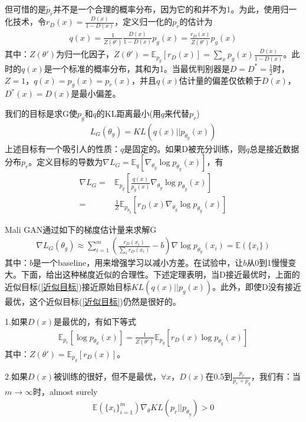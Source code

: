             但可惜的是$\tilde{p}_r$并不是一个合理的概率分布，因为它的和并不为1。为此，使用归一化技术，令$r_D(x) = \frac{D(x)}{1-D(x)}$，定义归一化的$p_r$的估计为
            \begin{align*}
            q(x) = \frac{1}{Z(\theta')} \frac{D(x)}{1-D(x)} p_g(x) = \frac{r_D(x)}{Z(\theta')}p_g(x)
            \end{align*}
            其中：$Z(\theta')$为归一化因子，$Z(\theta') = \mathbb{E}_{p_g}[r_D(x)] = \sum_x p_g(x) \frac{D(x)}{1-D(x)}$。此时的$q(x)$是一个标准的概率分布，其和为1。当最优判别器是$D = D^* = \frac{1}{2}$时，$Z = 1$，$q(x) = p_g(x) = p_r(x)$，并且$q(x)$估计量的偏差仅依赖于$D(x)$，$D^*(x) = D(x)$是最小偏差。
            \par
            我们的目标是求G使$p_g$和$q$的KL距离最小(用$q$来代替$p_r$)
            \begin{align*}
            L_G(\theta_g) = KL(q(x)||p_{\theta_g}(x))
            \end{align*}
            上述目标有一个吸引人的性质：$q$是固定的。如果D被充分训练，则$q$总是接近数据分布$p_r$。定义目标的导数为$\nabla L_G = \mathbb{E}_q[\nabla_{\theta_g} \log p_{\theta_g}(x)]$，有
            \begin{align*}
            \nabla L_G =& \mathbb{E}_{p_g} \left[ \frac{q(x)}{p_g(x)} \nabla_{\theta_g}\log p_{\theta_g}(x) \right]\\
            =& \frac{1}{Z}\mathbb{E}_{p_{\theta_g}} \left[r_D(x) \nabla_{\theta_g}\log p_{\theta_g}(x) \right]
            \end{align*}
            \par
            Mali GAN通过如下的梯度估计量来求解G
            \begin{align}
            \label{近似目标}
            \nabla L_G(\theta_g) \approx \sum_{i=1}^m \left( \frac{r_D(x_i)}{\sum_i r_D(x_i)} - b \right) \nabla \log p_{\theta_g}(x_i) = \mathbb{E}(\{x_i\})
            \end{align}
            其中：$b$是一个baseline，用来增强学习以减小方差。在试验中，让$b$从0到1慢慢变大。下面，给出这种梯度近似的合理性。下述定理表明，当D接近最优时，上面的近似目标(\ref{近似目标})接近原始目标$KL(q(x)||p_g(x))$。此外，即使D没有接近最优，这个近似目标(\ref{近似目标})仍然是很好的。
            \begin{theorem}
            \par
            1.如果$D(x)$是最优的，有如下等式
            \begin{align*}
            \mathbb{E}_{p_r}[\log p_{\theta_d}(x)] = \frac{1}{Z(\theta')} \mathbb{E}_{p_g}[r_D(x)\log p_{\theta_g}(x)]
            \end{align*}
            其中：$Z(\theta') = \mathbb{E}_{p_g}[r_D(x)]$。
            \par
            2.如果$D(x)$被训练的很好，但不是最优，$\forall x$，$D(x)$在0.5到$\frac{p_r}{p_r+p_g}$，我们有：当$m\to\infty$时，almost surely
            \begin{align*}
            \mathbb{E}(\{x_i\}_{i=1}^m)\nabla _\theta KL(p_r||p_{\theta_g}) > 0
            \end{align*}
            \end{theorem}
